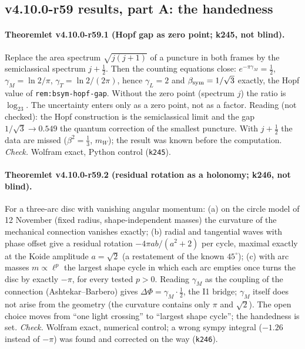 \subsection*{v4.10.0-r59 results, part A: the handedness}
\label{subsec:v4100-r59-results-a}

\paragraph{Theoremlet v4.10.0-r59.1 (Hopf gap as zero point; k245, not blind).}
Replace the area spectrum \(\sqrt{j(j+1)}\) of a puncture in both frames by the semiclassical spectrum \(j+\tfrac12\).  Then the counting
equations close: \(e^{-\pi\gamma_M}=\tfrac12\), \(\gamma_M=\ln2/\pi\), \(\gamma_T=\ln2/(2\pi)\), hence \(\gamma_L=2\) and \(\beta_{\rm sym}=1/\sqrt3\) exactly,
the Hopf value of \texttt{rem:bsym-hopf-gap}.  Without the zero point (spectrum \(j\)) the ratio is \(\log_23\).  The uncertainty enters only as a
zero point, not as a factor.  Reading (not checked): the Hopf construction is the semiclassical limit and the gap \(1/\sqrt3\to0.549\) the quantum
correction of the smallest puncture.  With \(j+\tfrac12\) the data are missed (\(\beta^2=\tfrac13\), \(m_W\)); the result was known before the computation.
\emph{Check.} Wolfram exact, Python control (\texttt{k245}).

\paragraph{Theoremlet v4.10.0-r59.2 (residual rotation as a holonomy; k246, not blind).}
For a three-arc disc with vanishing angular momentum:
(a) on the circle model of 12 November (fixed radius, shape-independent masses) the curvature of the mechanical connection vanishes exactly;
(b) radial and tangential waves with phase offset give a residual rotation \(-4\pi ab/(a^2+2)\) per cycle, maximal exactly at the Koide amplitude
\(a=\sqrt2\) (a restatement of the known \(45^\circ\));
(c) with arc masses \(m\propto\ell^p\) the largest shape cycle in which each arc empties once turns the disc by exactly \(-\pi\), for every tested \(p>0\).
Reading \(\gamma_M\) as the coupling of the connection (Ashtekar--Barbero) gives \(\Delta\Phi=\gamma_M\cdot\tfrac12\), the I1 bridge; \(\gamma_M\) itself does not
arise from the geometry (the curvature contains only \(\pi\) and \(\sqrt2\)).  The open choice moves from ``one light crossing'' to ``largest shape
cycle''; the handedness is set.  \emph{Check.} Wolfram exact, numerical control; a wrong sympy integral (\(-1.26\) instead of \(-\pi\)) was found
and corrected on the way (\texttt{k246}).

